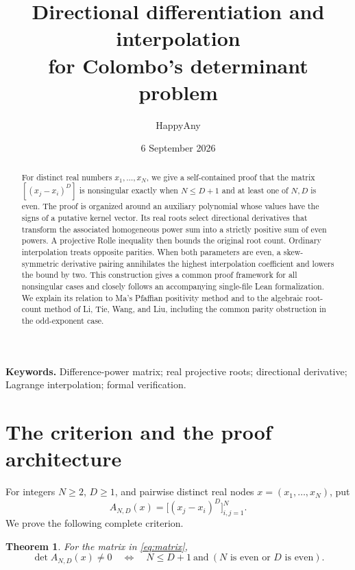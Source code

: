 \documentclass[11pt,a4paper]{article}
\title{\bfseries Directional differentiation and interpolation\\
for Colombo's determinant problem}
\author{HappyAny}
\date{6 September 2026}
\numberwithin{equation}{section}
\newtheorem{theorem}{Theorem}[section]
\theoremstyle{remark}
\begin{document}
\maketitle
\thispagestyle{plain}

\begin{abstract}
For distinct real numbers $x_1,\ldots,x_N$, we give a self-contained proof that
the matrix $[(x_j-x_i)^D]$ is nonsingular exactly when $N\le D+1$ and at least
one of $N,D$ is even. The proof is organized around an auxiliary polynomial
whose values have the signs of a putative kernel vector. Its real roots select
directional derivatives that transform the associated homogeneous power sum
into a strictly positive sum of even powers. A projective Rolle inequality
then bounds the original root count. Ordinary interpolation treats opposite
parities. When both parameters are even, a skew-symmetric derivative pairing
annihilates the highest interpolation coefficient and lowers the bound by two.
This construction gives a common proof framework for all nonsingular cases
and closely follows an accompanying single-file Lean formalization. We explain
its relation to Ma's Pfaffian positivity method and to the algebraic root-count
method of Li, Tie, Wang, and Liu, including the common parity obstruction in
the odd-exponent case.
\end{abstract}

\noindent\textbf{Keywords.} Difference-power matrix; real projective roots;
directional derivative; Lagrange interpolation; formal verification.

\section{The criterion and the proof architecture}

For integers $N\ge2$, $D\ge1$, and pairwise distinct real nodes
$x=(x_1,\ldots,x_N)$, put
\begin{equation}\label{eq:matrix}
 A_{N,D}(x)=\bigl[(x_j-x_i)^D\bigr]_{i,j=1}^{N}.
\end{equation}
We prove the following complete criterion.

\begin{theorem}\label{thm:main}
For the matrix in \eqref{eq:matrix},
\begin{equation}\label{eq:criterion}
 \det A_{N,D}(x)\ne0
 \quad\Longleftrightarrow\quad
 N\le D+1\ \text{and}\ (N\text{ is even or }D\text{ is even}).
\end{equation}
\end{theorem}
\end{document}
